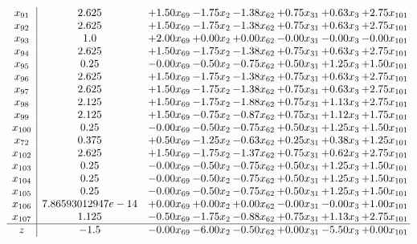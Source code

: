 \documentclass[8pt]{article}
\begin{document}
\[\begin{array}{c| c c@{\hskip 2pt} c@{\hskip 2pt} c@{\hskip 2pt} c@{\hskip 2pt} c@{\hskip 2pt} c@{\hskip 2pt} }
 x_{91}   &  2.625 & +  1.50 x_{69} & -1.75 x_{2} & -1.38 x_{62} & +  0.75 x_{31} & +  0.63 x_{3} & +  2.75 x_{101}\\
 x_{92}   &  2.625 & +  1.50 x_{69} & -1.75 x_{2} & -1.38 x_{62} & +  0.75 x_{31} & +  0.63 x_{3} & +  2.75 x_{101}\\
 x_{93}   &  1.0 & +  2.00 x_{69} & +  0.00 x_{2} & +  0.00 x_{62} & -0.00 x_{31} & -0.00 x_{3} & -0.00 x_{101}\\
 x_{94}   &  2.625 & +  1.50 x_{69} & -1.75 x_{2} & -1.38 x_{62} & +  0.75 x_{31} & +  0.63 x_{3} & +  2.75 x_{101}\\
 x_{95}   &  0.25 & -0.00 x_{69} & -0.50 x_{2} & -0.75 x_{62} & +  0.50 x_{31} & +  1.25 x_{3} & +  1.50 x_{101}\\
 x_{96}   &  2.625 & +  1.50 x_{69} & -1.75 x_{2} & -1.38 x_{62} & +  0.75 x_{31} & +  0.63 x_{3} & +  2.75 x_{101}\\
 x_{97}   &  2.625 & +  1.50 x_{69} & -1.75 x_{2} & -1.38 x_{62} & +  0.75 x_{31} & +  0.63 x_{3} & +  2.75 x_{101}\\
 x_{98}   &  2.125 & +  1.50 x_{69} & -1.75 x_{2} & -1.88 x_{62} & +  0.75 x_{31} & +  1.13 x_{3} & +  2.75 x_{101}\\
 x_{99}   &  2.125 & +  1.50 x_{69} & -0.75 x_{2} & -0.87 x_{62} & +  0.75 x_{31} & +  1.12 x_{3} & +  1.75 x_{101}\\
 x_{100}   &  0.25 & -0.00 x_{69} & -0.50 x_{2} & -0.75 x_{62} & +  0.50 x_{31} & +  1.25 x_{3} & +  1.50 x_{101}\\
 x_{72}   &  0.375 & +  0.50 x_{69} & -1.25 x_{2} & -0.63 x_{62} & +  0.25 x_{31} & +  0.38 x_{3} & +  1.25 x_{101}\\
 x_{102}   &  2.625 & +  1.50 x_{69} & -1.75 x_{2} & -1.37 x_{62} & +  0.75 x_{31} & +  0.62 x_{3} & +  2.75 x_{101}\\
 x_{103}   &  0.25 & -0.00 x_{69} & -0.50 x_{2} & -0.75 x_{62} & +  0.50 x_{31} & +  1.25 x_{3} & +  1.50 x_{101}\\
 x_{104}   &  0.25 & -0.00 x_{69} & -0.50 x_{2} & -0.75 x_{62} & +  0.50 x_{31} & +  1.25 x_{3} & +  1.50 x_{101}\\
 x_{105}   &  0.25 & -0.00 x_{69} & -0.50 x_{2} & -0.75 x_{62} & +  0.50 x_{31} & +  1.25 x_{3} & +  1.50 x_{101}\\
 x_{106}   &  7.86593012947e-14 & +  0.00 x_{69} & +  0.00 x_{2} & +  0.00 x_{62} & -0.00 x_{31} & -0.00 x_{3} & +  1.00 x_{101}\\
 x_{107}   &  1.125 & -0.50 x_{69} & -1.75 x_{2} & -0.88 x_{62} & +  0.75 x_{31} & +  1.13 x_{3} & +  2.75 x_{101}\\
\hline
z    &  -1.5 & -0.00 x_{69} & -6.00 x_{2} & -0.50 x_{62} & +  0.00 x_{31} & -5.50 x_{3} & +  0.00 x_{101}\\
\end{array}\]
\end{document}
